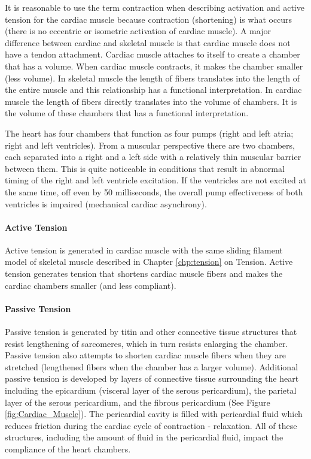 It is reasonable to use the term contraction when describing activation and active tension for the cardiac muscle because contraction (shortening) is what occurs (there is no eccentric or isometric activation of cardiac muscle). A major difference between cardiac and skeletal muscle is that cardiac muscle does not have a tendon attachment. Cardiac muscle attaches to itself to create a chamber that has a volume. When cardiac muscle contracts, it makes the chamber smaller (less volume). In skeletal muscle the length of fibers translates into the length of the entire muscle and this relationship has a functional interpretation. In cardiac muscle the length of fibers directly translates into the volume of chambers. It is the volume of these chambers that has a functional interpretation. 

The heart has four chambers that function as four pumps (right and left atria; right and left ventricles). From a muscular perspective there are two chambers, each separated into a right and a left side with a relatively thin muscular barrier between them. This is quite noticeable in conditions that result in abnormal timing of the right and left ventricle excitation. If the ventricles are not excited at the same time, off even by 50 milliseconds, the overall pump effectiveness of both ventricles is impaired (mechanical cardiac asynchrony).

\paragraph{Active Tension}

Active tension is generated in cardiac muscle with the same sliding filament model of skeletal muscle described in Chapter \ref{chp:tension} on Tension. Active tension generates tension that shortens cardiac muscle fibers and makes the cardiac chambers smaller (and less compliant). 

\paragraph{Passive Tension}

Passive tension is generated by titin and other connective tissue structures that resist lengthening of sarcomeres, which in turn resists enlarging the chamber. Passive tension also attempts to shorten cardiac muscle fibers when they are stretched (lengthened fibers when the chamber has a larger volume). Additional passive tension is developed by layers of connective tissue surrounding the heart including the epicardium (visceral layer of the serous pericardium), the parietal layer of the serous pericardium, and the fibrous pericardium (See Figure \ref{fig:Cardiac_Muscle}). The pericardial cavity is filled with pericardial fluid which reduces friction during the cardiac cycle of contraction - relaxation. All of these structures, including the amount of fluid in the pericardial fluid, impact the compliance of the heart chambers.

